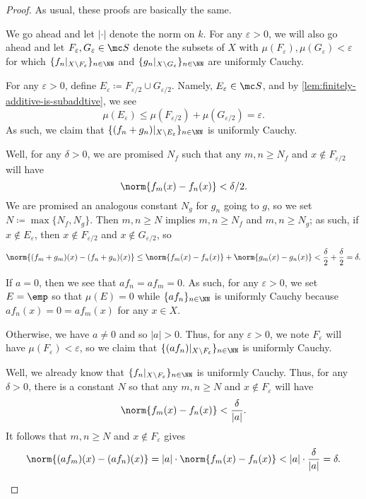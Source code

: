 \documentclass[../notes.tex]{subfiles}
\begin{document}
\begin{proof}
	As usual, these proofs are basically the same.
	
	We go ahead and let $|\cdot|$ denote the norm on $k$. For any $\varepsilon>0$, we will also go ahead and let $F_\varepsilon,G_\varepsilon\in\mc S$ denote the subsets of $X$ with $\mu(F_\varepsilon),\mu(G_\varepsilon)<\varepsilon$ for which $\{f_n|_{X\setminus F_\varepsilon}\}_{n\in\NN}$ and $\{g_n|_{X\setminus G_\varepsilon}\}_{n\in\NN}$ are uniformly Cauchy.
	\begin{listalph}
		\item For any $\varepsilon>0$, define $E_\varepsilon\coloneqq F_{\varepsilon/2}\cup G_{\varepsilon/2}$. Namely, $E_\varepsilon\in\mc S$, and by \autoref{lem:finitely-additive-is-subaddtive}, we see
		\[\mu(E_\varepsilon)\le\mu(F_{\varepsilon/2})+\mu(G_{\varepsilon/2})=\varepsilon.\]
		As such, we claim that $\{(f_n+g_n)|_{X\setminus E_\varepsilon}\}_{n\in\NN}$ is uniformly Cauchy.

		Well, for any $\delta>0$, we are promised $N_f$ such that any $m,n\ge N_f$ and $x\notin F_{\varepsilon/2}$ will have
		\[\norm{f_m(x)-f_n(x)}<\delta/2.\]
		We are promised an analogous constant $N_g$ for $g_n$ going to $g$, so we set $N\coloneqq\max\{N_f,N_g\}$. Then $m,n\ge N$ implies $m,n\ge N_f$ and $m,n\ge N_g$; as such, if $x\notin E_\varepsilon$, then $x\notin F_{\varepsilon/2}$ and $x\notin G_{\varepsilon/2}$, so
		\[\norm{(f_m+g_m)(x)-(f_n+g_n)(x)}\le\norm{f_m(x)-f_n(x)}+\norm{g_m(x)-g_n(x)}<\frac\delta2+\frac\delta2=\delta.\]

		\item If $a=0$, then we see that $af_n=af_m=0$. As such, for any $\varepsilon>0$, we set $E=\emp$ so that $\mu(E)=0$ while $\{af_n\}_{n\in\NN}$ is uniformly Cauchy because $af_n(x)=0=af_m(x)$ for any $x\in X$.

		Otherwise, we have $a\ne0$ and so $|a|>0$. Thus, for any $\varepsilon>0$, we note $F_\varepsilon$ will have $\mu(F_\varepsilon)<\varepsilon$, so we claim that $\{(af_n)|_{X\setminus F_\varepsilon}\}_{n\in\NN}$ is uniformly Cauchy.

		Well, we already know that $\{f_n|_{X\setminus F_\varepsilon}\}_{n\in\NN}$ is uniformly Cauchy. Thus, for any $\delta>0$, there is a constant $N$ so that any $m,n\ge N$ and $x\notin F_\varepsilon$ will have
		\[\norm{f_m(x)-f_n(x)}<\frac\delta{|a|}.\]
		It follows that $m,n\ge N$ and $x\notin F_\varepsilon$ gives
		\[\norm{(af_m)(x)-(af_n)(x)}=|a|\cdot\norm{f_m(x)-f_n(x)}<|a|\cdot\frac\delta{|a|}=\delta.\]


\end{listalph}
\end{proof}
\end{document}
